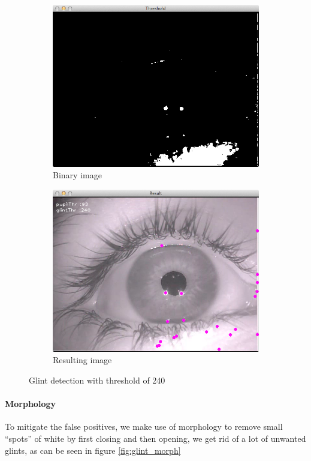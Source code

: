 \documentclass[a4paper,11pt]{article}
\begin{document}
\begin{figure}[H]
\centering
\begin{subfigure}{.48\textwidth}
  \centering
  \includegraphics[width=.8\linewidth]{glint_bin}
  \caption{Binary image}
  \label{fig:glint_binary}
\end{subfigure}
\begin{subfigure}{.48\textwidth}
  \centering
  \includegraphics[width=.8\linewidth]{glint_result}
  \caption{Resulting image}
  \label{fig:glint_result}
\end{subfigure}
\caption{Glint detection with threshold of 240}
\label{fig:glint}
\end{figure}

\paragraph{Morphology} To mitigate the false positives, we make use of morphology to remove small “spots” of white by first closing and then opening, we get rid of a lot of unwanted glints, as can be seen in figure \ref{fig:glint_morph}
\end{document}
